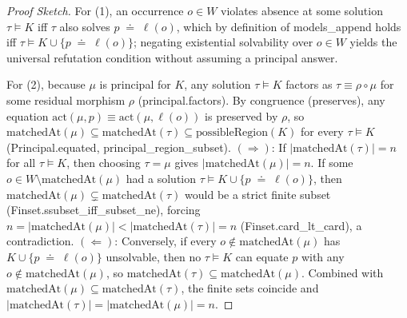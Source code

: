 \documentclass[11pt,a4paper]{article}
\theoremstyle{definition}
\DeclareRobustCommand{\lean}[1]{%
  \ifmmode\text{\normalfont\ttfamily\footnotesize\detokenize{#1}}%
  \else{\normalfont\footnotesize\leanurl{#1}}\fi}
\def\lean#1{#1}%
\newcommand{\doteqStore}{\;\doteq\;}
\begin{document}
\begin{proof}[Proof Sketch]
For (1), an occurrence $o \in W$ violates absence at some solution $\tau \models K$ iff $\tau$ also solves $p \doteqStore \ell(o)$, which by definition of \lean{models_append} holds iff $\tau \models K \cup \{p \doteqStore \ell(o)\}$; negating existential solvability over $o \in W$ yields the universal refutation condition without assuming a principal answer.

For (2), because $\mu$ is principal for $K$, any solution $\tau \models K$ factors as $\tau \equiv \rho \circ \mu$ for some residual morphism $\rho$ (\lean{principal.factors}). By congruence (\lean{preserves}), any equation $\mathrm{act}(\mu, p) \equiv \mathrm{act}(\mu, \ell(o))$ is preserved by $\rho$, so $\mathrm{matchedAt}(\mu) \subseteq \mathrm{matchedAt}(\tau) \subseteq \mathrm{possibleRegion}(K)$ for every $\tau \models K$ (\lean{Principal.equated}, \lean{principal_region_subset}).
$(\Rightarrow)$: If $|\mathrm{matchedAt}(\tau)| = n$ for all $\tau \models K$, then choosing $\tau = \mu$ gives $|\mathrm{matchedAt}(\mu)| = n$. If some $o \in W \setminus \mathrm{matchedAt}(\mu)$ had a solution $\tau \models K \cup \{p \doteqStore \ell(o)\}$, then $\mathrm{matchedAt}(\mu) \subsetneq \mathrm{matchedAt}(\tau)$ would be a strict finite subset (\lean{Finset.ssubset_iff_subset_ne}), forcing $n = |\mathrm{matchedAt}(\mu)| < |\mathrm{matchedAt}(\tau)| = n$ (\lean{Finset.card_lt_card}), a contradiction.
$(\Leftarrow)$: Conversely, if every $o \notin \mathrm{matchedAt}(\mu)$ has $K \cup \{p \doteqStore \ell(o)\}$ unsolvable, then no $\tau \models K$ can equate $p$ with any $o \notin \mathrm{matchedAt}(\mu)$, so $\mathrm{matchedAt}(\tau) \subseteq \mathrm{matchedAt}(\mu)$. Combined with $\mathrm{matchedAt}(\mu) \subseteq \mathrm{matchedAt}(\tau)$, the finite sets coincide and $|\mathrm{matchedAt}(\tau)| = |\mathrm{matchedAt}(\mu)| = n$.
\end{proof}
\end{document}

